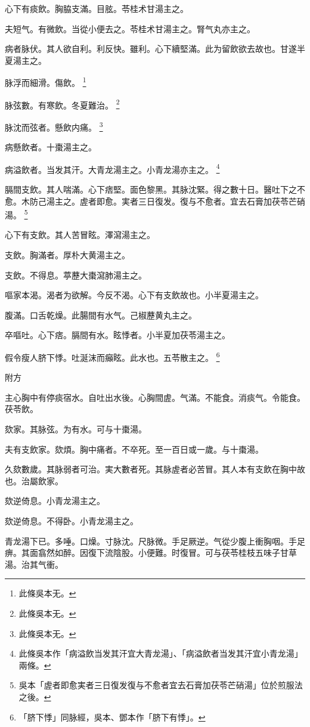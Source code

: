 心下有痰飲。胸脇支滿。目胘。苓桂术甘湯主之。

夫短气。有微飲。当從小便去之。苓桂术甘湯主之。腎气丸亦主之。

病者脉伏。其人欲自利。利反快。雖利。心下續堅滿。此为留飲欲去故也。甘遂半夏湯主之。

脉浮而細滑。傷飲。
	\footnote{此條吳本无。}

脉弦數。有寒飲。冬夏難治。
	\footnote{此條吳本无。}

脉沈而弦者。懸飲内痛。
	\footnote{此條吳本无。}

病懸飲者。十棗湯主之。

病溢飲者。当发其汗。大青龙湯主之。小青龙湯亦主之。
	\footnote{此條吳本作「病溢飲当发其汗宜大青龙湯」、「病溢飲者当发其汗宜小青龙湯」兩條。}

膈間支飲。其人喘滿。心下痞堅。面色黎黑。其脉沈緊。得之數十日。醫吐下之不愈。木防己湯主之。虗者即愈。実者三日復发。復与不愈者。宜去石膏加茯苓芒硝湯。
	\footnote{吳本「虗者即愈実者三日復发復与不愈者宜去石膏加茯苓芒硝湯」位於煎服法之後。}

心下有支飲。其人苦冒眩。澤瀉湯主之。

支飲。胸滿者。厚朴大黄湯主之。

支飲。不得息。葶藶大棗瀉肺湯主之。

嘔家本渴。渴者为欲解。今反不渴。心下有支飲故也。小半夏湯主之。

腹滿。口舌乾燥。此腸間有水气。己椒藶黄丸主之。

卒嘔吐。心下痞。膈間有水。眩悸者。{\khaaitp 小}半夏加茯苓湯主之。

假令瘦人脐下悸。吐涎沫而癲眩。{\khaaitp 此}水也。五苓散主之。
	\footnote{「脐下悸」同脉經，吳本、鄧本作「脐下有悸」。}

附方

主心胸中有停痰宿水。自吐出水後。心胸間虗。气滿。不能食。消痰气。令能食。茯苓飲。

欬家。其脉弦。为有水。可与十棗湯。

夫有支飲家。欬煩。胸中痛者。不卒死。至一百日{\khaaitp 或}一歲。与十棗湯。

久欬數歲。其脉弱者可治。実大數者死。其脉虗者必苦冒。其人本有支飲在胸中故也。治屬飲家。

欬逆倚息。小青龙湯主之。{\wuben}

欬逆倚息。不得卧。小青龙湯主之。{\dengben}

青龙湯下已。多唾。口燥。寸脉沈。尺脉微。手足厥逆。气從少腹上衝胸咽。手足痹。其面翕然如醉。因復下流陰股。小便難。时復冒。可与茯苓桂枝五味子甘草湯。治其气衝。{\wuben}

